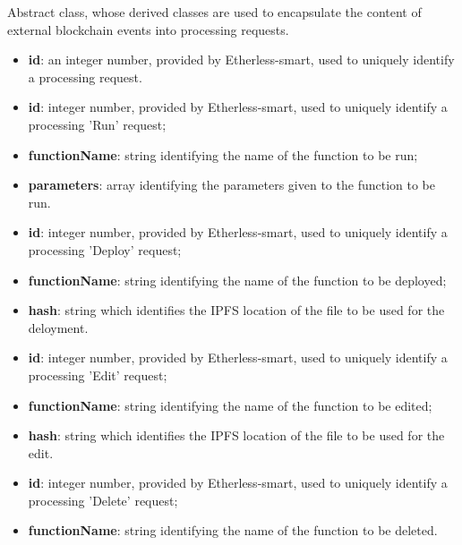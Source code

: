 	Abstract class, whose derived classes are used to encapsulate the content of external blockchain events into processing requests.
	\begin{itemize}
		\item \textbf{id}: an integer number, provided by Etherless-smart, used to uniquely identify a processing request.
	\end{itemize}
	\begin{itemize}
		\item \textbf{id}: integer number, provided by Etherless-smart, used to uniquely identify a processing 'Run' request;
		\item \textbf{functionName}: string identifying the name of the function to be run;
		\item \textbf{parameters}: array identifying the parameters given to the function to be run.
	\end{itemize}
	\begin{itemize}
		\item \textbf{id}: integer number, provided by Etherless-smart, used to uniquely identify a processing 'Deploy' request;
		\item \textbf{functionName}: string identifying the name of the function to be deployed;
		\item \textbf{hash}: string which identifies the IPFS location of the file to be used for the deloyment.
	\end{itemize}
	\begin{itemize}
		\item \textbf{id}: integer number, provided by Etherless-smart, used to uniquely identify a processing 'Edit' request;
		\item \textbf{functionName}: string identifying the name of the function to be edited;
		\item \textbf{hash}: string which identifies the IPFS location of the file to be used for the edit.
	\end{itemize}
	\begin{itemize}
		\item \textbf{id}: integer number, provided by Etherless-smart, used to uniquely identify a processing 'Delete' request;
		\item \textbf{functionName}: string identifying the name of the function to be deleted.
	\end{itemize}


